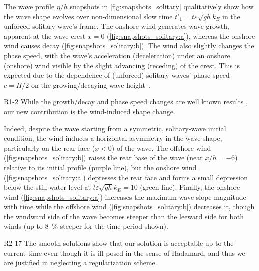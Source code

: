 \documentclass{jfm}
\renewcommand*{\epsilon}{\varepsilon}
\begin{document}
The wave profile $\eta/h$ snapshots in \cref{fig:snapshots_solitary}
qualitatively show how the wave shape evolves over non-dimensional slow
time $t'_1 = t \epsilon \sqrt{g h} k_E$ in the unforced solitary wave's
frame.
The onshore wind generates wave growth, apparent at the wave
crest $x=0$ (\cref{fig:snapshots_solitary:a}), whereas the onshore wind
causes decay (\cref{fig:snapshots_solitary:b}).
The wind also slightly changes the phase speed, with the wave's
acceleration (deceleration) under an onshore (onshore) wind visible by
the slight advancing (receding) of the crest.
This is expected due to the dependence of (unforced) solitary waves' phase
speed $c = H/2$ on the growing/decaying wave
height~\cite[\eg][]{mei2005nonlinear}.
\begin{LineLabel}{R1-2}
While the growth/decay and phase speed changes are well known results
\citep[\eg][]{jeffreys1925formation,miles1957generation}, our new
contribution is the wind-induced shape change.
\end{LineLabel}
Indeed, despite the wave starting from a symmetric, solitary-wave
initial condition, the wind induces a horizontal asymmetry in the wave
shape, particularly on the rear face ($x<0$) of the wave.
The offshore wind (\cref{fig:snapshots_solitary:b}) raises the
rear base of the wave (near $x/h = -6$) relative to its initial profile
(purple line), but the onshore wind (\cref{fig:snapshots_solitary:a})
depresses the rear face and forms a small depression below the still
water level at $t\epsilon \sqrt{gh} k_E=10$ (green line).
Finally, the onshore wind (\cref{fig:snapshots_solitary:a})
increases the maximum wave-slope magnitude with time while the offshore
wind (\cref{fig:snapshots_solitary:b}) decreases it, though the windward
side of the wave becomes steeper than the leeward side for both winds
(up to \SI{8}{\percent} steeper for the time period shown).
\begin{LineLabel}{R2-17}
The smooth solutions show that our solution is acceptable up to the
current time even though it is ill-posed in the sense of Hadamard, and
thus we are justified in neglecting a regularization scheme.
\end{LineLabel}
\end{document}
